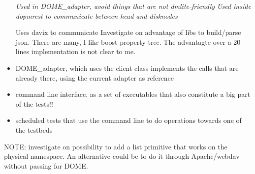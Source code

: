 \documentclass[a4paper,10pt]{scrreprt}
\begin{document}
\begin{itemize}
 \subitem \textit{Used in DOME\_adapter, avoid things that are not dmlite-friendly}
 \subitem \textit{Used inside dopmrest to communicate between head and disknodes}
 
 \subitem Uses davix to communicate
 \subitem Investigate on advantage of libs to build/parse json. There are many, I like boost property tree. The advantagte over a 20 lines implementation is not clear to me.
 
 \item DOME\_adapter, which uses the client class
 \subitem implements the calls that are already there, using the current adapter as reference
 
 \item command line interface, as a set of executables that also constitute a big part of the tests!!

 \item scheduled tests that use the command line to do operations towards one of the testbeds
 
\end{itemize}


NOTE: investigate on possibility to add a list primitive that works on the physical namespace. An alternative could be to do it through Apache/webdav without passing for DOME.
\end{document}

